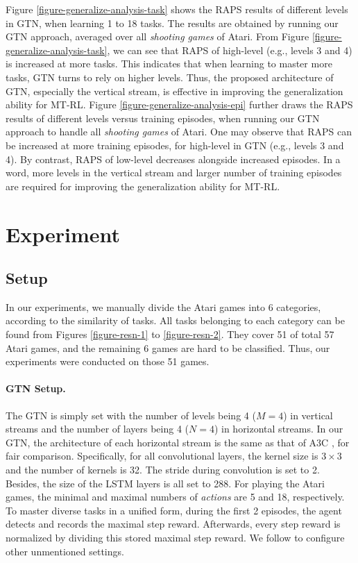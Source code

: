 \documentclass[letterpaper]{article} %
\begin{document}
Figure \ref{figure-generalize-analysis-task} shows the RAPS results of different levels in GTN, when learning 1 to 18 tasks.
The results are obtained by running our GTN approach, averaged over all \textit{shooting games} of Atari.
From Figure \ref{figure-generalize-analysis-task}, we can see that RAPS of high-level (e.g., levels 3 and 4) is increased at more tasks.
This indicates that when learning to master more tasks, GTN turns to rely on higher levels.
Thus, the proposed architecture of GTN, especially the vertical stream, is effective in improving the generalization ability for MT-RL.
Figure \ref{figure-generalize-analysis-epi} further draws the RAPS results of different levels versus training episodes, when running our GTN approach to handle all \textit{shooting games} of Atari.
One may observe that RAPS can be increased at more training episodes, for high-level in GTN (e.g., levels 3 and 4).
By contrast, RAPS of low-level decreases alongside increased episodes.
In a word, more levels in the vertical stream and larger number of training episodes are required for improving the generalization ability for MT-RL.


\section{Experiment}

\subsection{Setup}
\label{section-exp-setup}

In our experiments, we manually divide the Atari games into 6 categories, according to the similarity of tasks. All tasks belonging to each category can be found from Figures \ref{figure-resn-1} to \ref{figure-resn-2}. They cover 51 of total 57 Atari games, and the remaining 6 games are hard to be classified. Thus, our experiments were conducted on those 51 games.

\paragraph{GTN Setup.}
The GTN is simply set with the number of levels being 4 ($M=4$) in vertical streams and the number of layers being 4 ($N=4$) in horizontal streams.
In our GTN, the architecture of each horizontal stream is the same as that of A3C \cite{mnih2016asynchronous}, for fair comparison.
Specifically, for all convolutional layers, the kernel size is $3 \times 3$ and the number of kernels is 32.
The stride during convolution is set to 2.
Besides, the size of the LSTM layers is all set to 288.
For playing the Atari games, the minimal and maximal numbers of \textit{actions} are 5 and 18, respectively.
To master diverse tasks in a unified form, during the first 2 episodes, the agent detects and records the maximal step reward.
Afterwards, every step reward is normalized by dividing this stored maximal step reward.
We follow \cite{mnih2016asynchronous} to configure other unmentioned settings.
\end{document}
